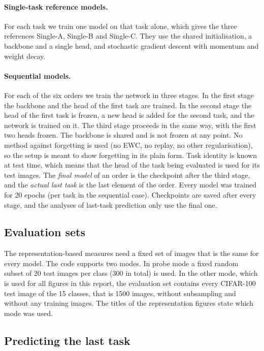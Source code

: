 \documentclass[11pt,a4paper]{article}
\begin{document}
\paragraph{Single-task reference models.} For each task we train one model on that task alone, which gives the three references \textsf{Single-A}, \textsf{Single-B} and \textsf{Single-C}. They use the shared initialisation, a backbone and a single head, and stochastic gradient descent with momentum and weight decay.

\paragraph{Sequential models.} For each of the six orders we train the network in three stages. In the first stage the backbone and the head of the first task are trained. In the second stage the head of the first task is frozen, a new head is added for the second task, and the network is trained on it. The third stage proceeds in the same way, with the first two heads frozen. The backbone is shared and is not frozen at any point. No method against forgetting is used (no EWC, no replay, no other regularisation), so the setup is meant to show forgetting in its plain form. Task identity is known at test time, which means that the head of the task being evaluated is used for its test images. The \emph{final model} of an order is the checkpoint after the third stage, and the \emph{actual last task} is the last element of the order. Every model was trained for 20 epochs (per task in the sequential case). Checkpoints are saved after every stage, and the analyses of last-task prediction only use the final one.

\subsection{Evaluation sets}

The representation-based measures need a fixed set of images that is the same for every model. The code supports two modes. In probe mode a fixed random subset of 20 test images per class (300 in total) is used. In the other mode, which is used for all figures in this report, the evaluation set contains every CIFAR-100 test image of the 15 classes, that is 1500 images, without subsampling and without any training images. The titles of the representation figures state which mode was used.

\subsection{Predicting the last task}
\end{document}
